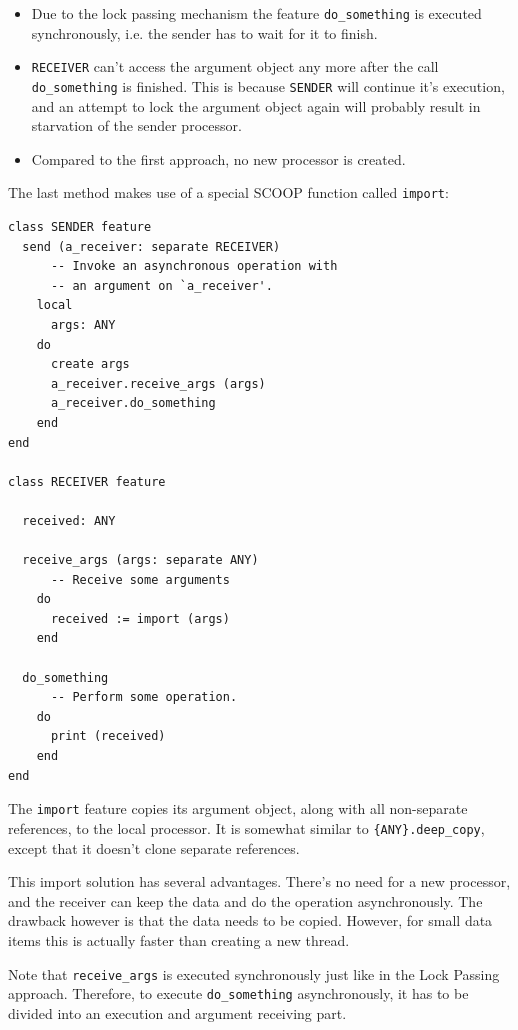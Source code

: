 \documentclass[a4paper,10pt]{article}
\begin{document}
\begin{itemize}
 \item Due to the lock passing mechanism \cite[p. 152]{Nienaltowski07}\cite{web:scoop} the feature \lstinline!do_something! is executed synchronously, i.e. the sender has to wait for it to finish.
 \item \lstinline!RECEIVER! can't access the argument object any more after the call \lstinline!do_something! is finished.
 This is because \lstinline!SENDER! will continue it's execution, and an attempt to lock the argument object again will probably result in starvation of the sender processor.
 \item Compared to the first approach, no new processor is created.
\end{itemize}

The last method makes use of a special SCOOP function called \lstinline!import!:
\begin{lstlisting}[language=OOSC2Eiffel, captionpos=b, caption={Migrate objects with import.}]
class SENDER feature
  send (a_receiver: separate RECEIVER)
      -- Invoke an asynchronous operation with
      -- an argument on `a_receiver'.
    local
      args: ANY
    do
      create args
      a_receiver.receive_args (args)
      a_receiver.do_something
    end
end

class RECEIVER feature
  
  received: ANY
  
  receive_args (args: separate ANY)
      -- Receive some arguments
    do
      received := import (args)
    end

  do_something
      -- Perform some operation.
    do
      print (received)
    end
end
\end{lstlisting}
The \lstinline!import! feature copies its argument object, along with all non-separate references, to the local processor.
It is somewhat similar to \lstinline!{ANY}.deep_copy!, except that it doesn't clone separate references.

This import solution has several advantages.
There's no need for a new processor, and the receiver can keep the data and do the operation asynchronously.
The drawback however is that the data needs to be copied.
However, for small data items this is actually faster than creating a new thread.

Note that \lstinline!receive_args! is executed synchronously just like in the Lock Passing approach.
Therefore, to execute \lstinline!do_something! asynchronously, it has to be divided into an execution and argument receiving part.
\end{document}
